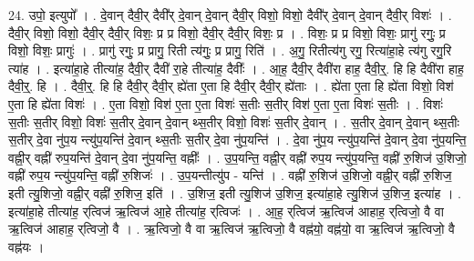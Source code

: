 \documentclass[17pt]{extarticle}
\begin{document}
24. उपो॒ इत्युपो᳚ । . दे॒वान् दैवी॒र् दैवी᳚र् दे॒वान् दे॒वान् दैवी॒र् विशो॒ विशो॒ दैवी᳚र् दे॒वान् दे॒वान् दैवी॒र् विशः॑ । . दैवी॒र् विशो॒ विशो॒ दैवी॒र् दैवी॒र् विशः॒ प्र प्र विशो॒ दैवी॒र् दैवी॒र् विशः॒ प्र । . विशः॒ प्र प्र विशो॒ विशः॒ प्रागु॑ रगुः॒ प्र विशो॒ विशः॒ प्रागुः॑ । . प्रागु॑ रगुः॒ प्र प्रागु॒ रिती त्य॑गुः॒ प्र प्रागु॒ रिति॑ । . अ॒गु॒ रितीत्य॑गु रगु॒ रित्या॑हा॒हे त्य॑गु रगु॒रि त्या॑ह । . इत्या॑हा॒हे तीत्या॑ह॒ दैवी॒र् दैवी॑ रा॒हे तीत्या॑ह॒ दैवीः᳚ । . आ॒ह॒ दैवी॒र् दैवी॑रा हाह॒ दैवी॒र्॒. हि हि दैवी॑रा हाह॒ दैवी॒र्॒. हि । . दैवी॒र्॒. हि हि दैवी॒र् दैवी॒र् ह्ये॑ता ए॒ता हि दैवी॒र् दैवी॒र् ह्ये॑ताः । . ह्ये॑ता ए॒ता हि ह्ये॑ता विशो॒ विश॑ ए॒ता हि ह्ये॑ता विशः॑ । . ए॒ता विशो॒ विश॑ ए॒ता ए॒ता विशः॑ स॒तीः स॒तीर् विश॑ ए॒ता ए॒ता विशः॑ स॒तीः । . विशः॑ स॒तीः स॒तीर् विशो॒ विशः॑ स॒तीर् दे॒वान् दे॒वान् थ्स॒तीर् विशो॒ विशः॑ स॒तीर् दे॒वान् । . स॒तीर् दे॒वान् दे॒वान् थ्स॒तीः स॒तीर् दे॒वा नु॑प॒य न्त्यु॑प॒यन्ति॑ दे॒वान् थ्स॒तीः स॒तीर् दे॒वा नु॑प॒यन्ति॑ । . दे॒वा नु॑प॒य न्त्यु॑प॒यन्ति॑ दे॒वान् दे॒वा नु॑प॒यन्ति॒ वह्नी॒र् वह्नी॑ रुप॒यन्ति॑ दे॒वान् दे॒वा नु॑प॒यन्ति॒ वह्नीः᳚ । . उ॒प॒यन्ति॒ वह्नी॒र् वह्नी॑ रुप॒य न्त्यु॑प॒यन्ति॒ वह्नी॑ रु॒शिज॑ उ॒शिजो॒ वह्नी॑ रुप॒य न्त्यु॑प॒यन्ति॒ वह्नी॑ रु॒शिजः॑ । . उ॒प॒यन्तीत्यु॑प - यन्ति॑ । . वह्नी॑ रु॒शिज॑ उ॒शिजो॒ वह्नी॒र् वह्नी॑ रु॒शिज॒ इती त्यु॒शिजो॒ वह्नी॒र् वह्नी॑ रु॒शिज॒ इति॑ । . उ॒शिज॒ इती त्यु॒शिज॑ उ॒शिज॒ इत्या॑हा॒हे त्यु॒शिज॑ उ॒शिज॒ इत्या॑ह । . इत्या॑हा॒हे तीत्या॑ह॒ र्‌त्विज॑ ऋ॒त्विज॑ आ॒हे तीत्या॑ह॒ र्‌त्विजः॑ । . आ॒ह॒ र्‌त्विज॑ ऋ॒त्विज॑ आहाह॒ र्‌त्विजो॒ वै वा ऋ॒त्विज॑ आहाह॒ र्‌त्विजो॒ वै । . ऋ॒त्विजो॒ वै वा ऋ॒त्विज॑ ऋ॒त्विजो॒ वै वह्न॑यो॒ वह्न॑यो॒ वा ऋ॒त्विज॑ ऋ॒त्विजो॒ वै वह्न॑यः । \newline
\end{document}
